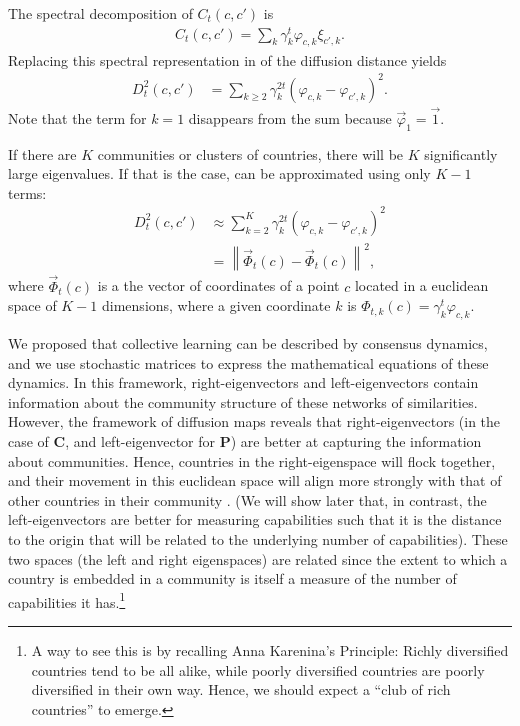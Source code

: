 \documentclass[12pt]{article}
\newcommand{\mtx}[1]{\mathbf{ #1}}
\begin{document}
The spectral decomposition of $C_t(c,c')$ is
\begin{align}
	C_t(c,c') = \sum_k \gamma_k^t \varphi_{c,k} \xi_{c',k}.
\end{align}
Replacing this spectral representation in  of the diffusion distance yields
\begin{align}
	D_t^2(c,c') &= \sum_{k\geq 2} \gamma_k^{2t} \left(\varphi_{c,k} - \varphi_{c',k}\right)^2.
\label{eq_diffdisteig}
\end{align}
Note that the term for $k=1$ disappears from the sum because $\vec{\varphi}_1 = \vec{1}$. 

If there are $K$ communities or clusters of countries, there will be $K$ significantly large eigenvalues. If that is the case,  can be approximated using only $K-1$ terms:
\begin{align}
	D_t^2(c,c') &\approx \sum_{k = 2}^{K} \gamma_k^{2t} \left(\varphi_{c,k} - \varphi_{c',k}\right)^2 \nonumber\\
	&=\left\| \vec{\Phi}_t(c) - \vec{\Phi}_t(c) \right\|^2,
\label{eq_diffdisteigapprox}
\end{align}
where $\vec{\Phi}_t(c)$ is a the vector of coordinates of a point $c$ located in a euclidean space of $K-1$ dimensions, where a given coordinate $k$ is $\Phi_{t,k}(c) = \gamma_k^{t}\varphi_{c,k}$.


We proposed that collective learning can be described by consensus dynamics, and we use stochastic matrices to express the mathematical equations of these dynamics. In this framework, right-eigenvectors and left-eigenvectors contain information about the community structure of these networks of similarities. However, the framework of diffusion maps reveals that right-eigenvectors (in the case of $\mtx{C}$, and left-eigenvector for $\mtx{P}$) are better at capturing the information about communities. Hence, countries in the right-eigenspace will flock together, and their movement in this euclidean space will align more strongly with that of other countries in their community \citep{coifman_diffusion_2014}. (We will show later that, in contrast, the left-eigenvectors are better for measuring capabilities such that it is the distance to the origin that will be related to the underlying number of capabilities). These two spaces (the left and right eigenspaces) are related since the extent to which a country is embedded in a community is itself a measure of the number of capabilities it has.\footnote{A way to see this is by recalling Anna Karenina's Principle: Richly diversified countries tend to be all alike, while poorly diversified countries are poorly diversified in their own way. Hence, we should expect a ``club of rich countries'' to emerge.}
\end{document}

